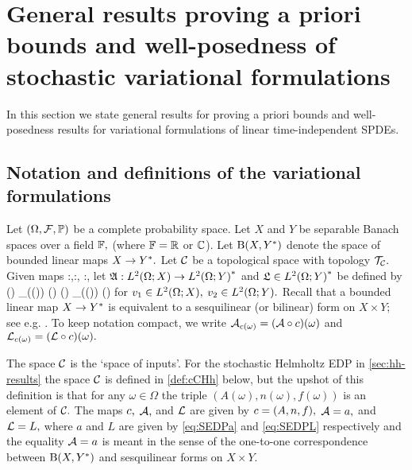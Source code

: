 \section[General stochastic a priori bounds and well-posedness]{General results proving a priori bounds and well-posedness of stochastic variational formulations}\label{sec:gen-framework}\label{sec:general}
In this section we state general results for proving a priori bounds and well-posedness results for variational formulations of linear time-independent SPDEs.

\subsection{Notation and definitions of the variational formulations}\label{sec:notdef}
Let $\OFP$ be a complete probability space. Let $X$ and $Y$ be separable Banach spaces over a field $\mathbb F,$ (where $\mathbb F = \mathbb R$ or $\mathbb C$).
Let $\homspace$ denote the space of bounded linear maps $X\rightarrow Y^{*}.$ Let $\mathcal C$ be a topological space with topology $\mathcal T_{\mathcal C}.$ Given maps
\beqs
\coeff:\Omega\rightarrow\cC,\quad\toform:\cC \rightarrow \homspace,\quad{} \rhs:\cC \rightarrow \Ys,
\eeqs let $\SAc:\LtOX \rightarrow \LtOYas$ and  $\SLc \in \LtOYas$ be defined by
\beq\label{eq:SA}
\big[\SAc(\vo)\big](\vt) \de \int_\Omega \big[\Acomega \vo(\omega)\big]\big(\vt(\omega)\big) \dd\PP(\omega) \quad{} \quad 
\SLc(\vt) \de \int_\Omega \Lcomega\big(\vt(\omega)\big) \dd \PP(\omega)
\eeq
for $\vo \in \LtOX,$ $\vt \in \LtOY.$ Recall that a bounded linear map $X\rightarrow Y^{*}$ is equivalent to a sesquilinear (or bilinear) form on $X \times Y;$ see e.g. \cite[Lemma 2.1.38]{SaSc:11}. To keep notation compact, we write $\Acomega=(\toform \circ c)(\omega)$ and $\Lcomega=(\rhs\circ c)(\omega).$



The space $\mathcal C$ is the `space of inputs'. For the stochastic Helmholtz EDP in \cref{sec:hh-results} the space $\mathcal C$ is defined in \cref{def:cCHh} below, but the upshot of this definition is that for any $\omega \in \Omega$ the triple $(A(\omega),n(\omega),f(\omega))$ is an element of $\mathcal C.$
The maps $c,$ $\mathcal A,$ and $\mathcal L$ are given by $\coeff = \mleft(A,n,f\mright),$ $\mathcal A = a,$ and $\mathcal L = L,$ where $a$ and $L$ are given by \eqref{eq:SEDPa} and \eqref{eq:SEDPL} respectively and the equality $\mathcal A=a$ is meant in the sense of the one-to-one correspondence between $\homspace$ and sesquilinear forms on $X\times Y.$
\ere

